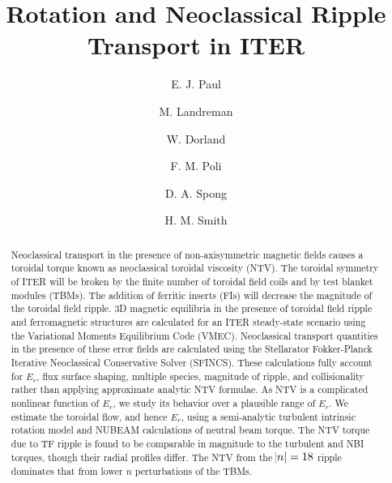 \documentclass[aip, pop, preprint]{revtex4-1}
\numberwithin{figure}{section}
\numberwithin{equation}{section}
\begin{document}
\title{Rotation and Neoclassical Ripple Transport in ITER}
\author{E. J. Paul}

\author{M. Landreman}

\author{W. Dorland}

\author{F. M. Poli}

\author{D. A. Spong}

\author{H. M. Smith}

\begin{abstract}

Neoclassical transport in the presence of non-axisymmetric magnetic fields causes a toroidal torque known as neoclassical toroidal viscosity (NTV). The toroidal symmetry of ITER will be broken by the finite number of toroidal field coils and by test blanket modules (TBMs). The addition of ferritic inserts (FIs) will decrease the magnitude of the toroidal field ripple. 3D magnetic equilibria in the presence of toroidal field ripple and ferromagnetic structures are calculated for an ITER steady-state scenario using the Variational Moments Equilibrium Code (VMEC). Neoclassical transport quantities in the presence of these error fields are calculated using the Stellarator Fokker-Planck Iterative Neoclassical Conservative Solver (SFINCS). These calculations fully account for $E_r$, flux surface shaping, multiple species, magnitude of ripple, and collisionality rather than applying approximate analytic NTV formulae. As NTV is a complicated nonlinear function of $E_r$, we study its behavior over a plausible range of $E_r$. We estimate the toroidal flow, and hence $E_r$, using a semi-analytic turbulent intrinsic rotation model and NUBEAM calculations of neutral beam torque. The NTV torque due to TF ripple is found to be comparable in magnitude to the turbulent and NBI torques, though their radial profiles differ. The NTV from the $\abs{n} = 18$ ripple dominates that from lower $n$ perturbations of the TBMs. 
\end{abstract}
\end{document}
